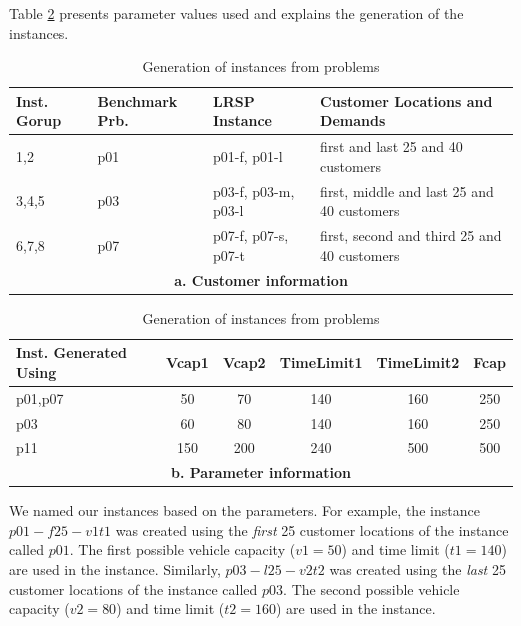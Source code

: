 Table \ref{probparam} presents parameter values used and explains
the generation of the instances.   
\begin {table}[h]
\begin{center}
\caption {Generation of instances from \citet{Cordeau2} problems} \label{probparam}
\begin {tabular}[t]{llll} 
Inst. Gorup	&	Benchmark Prb.	&	LRSP Instance 	&	Customer Locations and Demands	\\\hline
1,2	&	p01	&	p01-f, p01-l	&	first and last 25 and 40 customers	\\
3,4,5	&	p03	&	p03-f, p03-m, p03-l	&	first, middle and last 25 and 40 customers	\\
6,7,8	&	p07	&	p07-f, p07-s, p07-t	&	first, second and third 25 and 40 customers	\\\hline
\multicolumn{4}{c}{{\bf a. Customer information }} 
\end{tabular}
\begin {tabular}[t]{lccccc} 
Inst. Generated Using & Vcap1	& Vcap2	& TimeLimit1 &	TimeLimit2 & Fcap\\\hline
p01,p07	& 	50	&	70	&	140	&	160	&	250 \\
p03	&	60	&	80	&	140	&	160	&	250\\
p11	&	150	&	200	&	240	&	500	&	500\\\hline
\multicolumn{6}{c}{{\bf b. Parameter information }} 
\end{tabular}
\end{center}
\end {table} 

We named our instances based on the parameters. For example, the instance 
$p01-f25-v1t1$ was created using the {\em first} 25 customer locations of  
the \citet{Cordeau} instance called $p01$. The first possible vehicle capacity ($v1=50$) and time limit
($t1=140$) are used in the instance. Similarly, $p03-l25-v2t2$ was created using the {\em last} 
25 customer locations of the \citet{Cordeau} instance called $p03$. The second possible vehicle 
capacity ($v2=80$) and time limit ($t2=160$) are used in the instance.  

